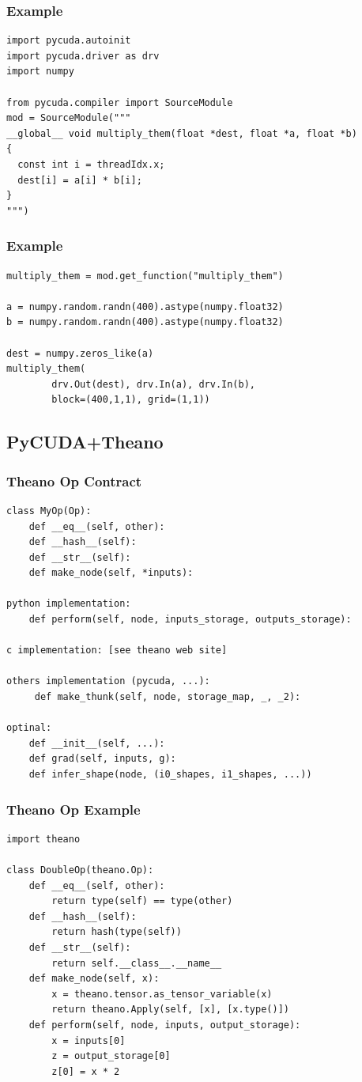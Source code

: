 \documentclass[a4paper,9pt]{beamer}
\begin{document}
\begin{frame}[fragile]
\frametitle{Example}
\begin{Verbatim}
import pycuda.autoinit
import pycuda.driver as drv
import numpy

from pycuda.compiler import SourceModule
mod = SourceModule("""
__global__ void multiply_them(float *dest, float *a, float *b)
{
  const int i = threadIdx.x;
  dest[i] = a[i] * b[i];
}
""")

\end{Verbatim}
\end{frame}

\begin{frame}[fragile]
\frametitle{Example}
\begin{Verbatim}
multiply_them = mod.get_function("multiply_them")

a = numpy.random.randn(400).astype(numpy.float32)
b = numpy.random.randn(400).astype(numpy.float32)

dest = numpy.zeros_like(a)
multiply_them(
        drv.Out(dest), drv.In(a), drv.In(b),
        block=(400,1,1), grid=(1,1))
\end{Verbatim}
\end{frame}



\subsection{PyCUDA+Theano}
\begin{frame}[fragile]
\frametitle{Theano Op Contract}
\begin{Verbatim}
class MyOp(Op):
    def __eq__(self, other):
    def __hash__(self):
    def __str__(self):
    def make_node(self, *inputs):

python implementation:
    def perform(self, node, inputs_storage, outputs_storage):

c implementation: [see theano web site]

others implementation (pycuda, ...):
     def make_thunk(self, node, storage_map, _, _2):

optinal:
    def __init__(self, ...):
    def grad(self, inputs, g):
    def infer_shape(node, (i0_shapes, i1_shapes, ...))
\end{Verbatim}
\end{frame}

\begin{frame}[fragile]
\frametitle{Theano Op Example}
\begin{Verbatim}
import theano

class DoubleOp(theano.Op):
    def __eq__(self, other):
        return type(self) == type(other)
    def __hash__(self):
        return hash(type(self))
    def __str__(self):
        return self.__class__.__name__
    def make_node(self, x):
        x = theano.tensor.as_tensor_variable(x)
        return theano.Apply(self, [x], [x.type()])
    def perform(self, node, inputs, output_storage):
        x = inputs[0]
        z = output_storage[0]
        z[0] = x * 2

\end{Verbatim}
\end{frame}
\end{document}
